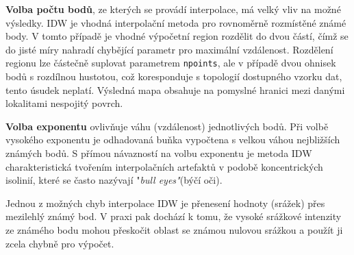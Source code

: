 \documentclass[a4paper,12pt,oneside]{report}
\begin{document}
\begin{description}
\item \textbf{Volba počtu bodů}, ze kterých se provádí interpolace, má
  velký vliv na možné výsledky. IDW je vhodná interpolační metoda pro
  rovnoměrně rozmístěné známé body. V tomto případě je vhodné
  výpočetní region rozdělit do dvou částí, čímž se do jisté míry
  nahradí chybějící parametr pro maximální vzdálenost. Rozdělení
  regionu lze částečně suplovat parametrem \texttt{npoints}, ale v
  případě dvou ohnisek bodů s rozdílnou hustotou, což koresponduje s
  topologií dostupného vzorku dat, tento úsudek neplatí. Výsledná mapa
  obsahuje na pomy\-slné hranici mezi danými lokalitami nespojitý povrch.

\item \textbf{Volba exponentu} ovlivňuje váhu (vzdálenost)
  jednotlivých bodů. Při volbě vysokého exponentu je odhadovaná buňka
  vypočtena s velkou váhou nej\-bližších známých bodů. S přímou
  návazností na volbu exponentu je metoda IDW charakteristická
  tvořením interpolačních artefaktů v podobě koncentrických isolinií,
  které se často nazývají "\textit{bull eyes"}(býčí oči).
\end{description} 



Jednou z možných chyb interpolace IDW je přenesení hodnoty (srážek)
přes mezilehlý známý bod. V praxi pak dochází k tomu, že vysoké
srážkové intenzity ze známého bodu mohou přeskočit oblast se známou
nulovou srážkou a použít ji zcela chybně pro výpočet.


\end{document}
